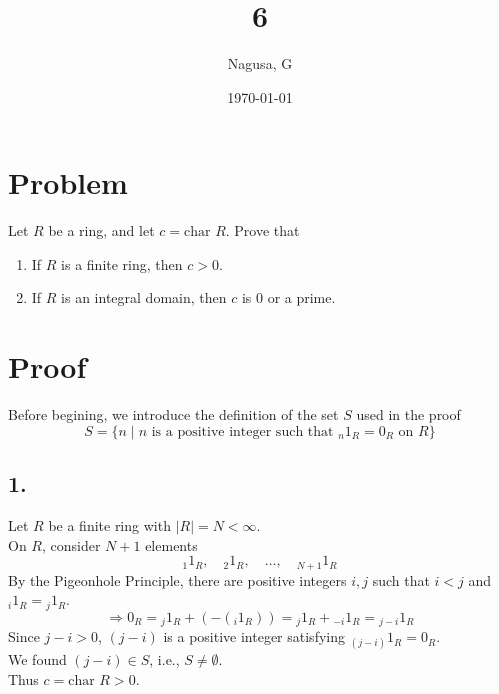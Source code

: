 \documentclass[11pt, a4paper]{article}
\title{6}
\author{Nagusa, G}
\date{\today}
\begin{document}
\maketitle

\section*{Problem}
Let $R$ be a ring, and let $c = \text{char } R$.
Prove that
\begin{enumerate}
    \item If $R$ is a finite ring, then $c > 0$.
    \item If $R$ is an integral domain, then $c$ is $0$ or a prime.
\end{enumerate}

\section*{Proof}
Before begining, we introduce the definition of the set $S$ used in the proof
\[
S = \{n \mid n \text{ is a positive integer such that } {}_n 1_R = 0_R \text{ on } R\}
\]

\subsection*{1.}
Let $R$ be a finite ring with $|R| = N < \infty$.\\
On $R$, consider $N+1$ elements
\[
{}_1 1_R,\quad {}_2 1_R,\quad \dots ,\quad {}_{N+1} 1_R
\]
By the Pigeonhole Principle, there are positive integers $i,j$ such that $i < j$ and ${}_i 1_R = {}_j 1_R$.
\[
\Rightarrow 0_R = {}_j 1_R + (-({}_i 1_R)) = {}_j 1_R + {}_{-i} 1_R = {}_{j-i} 1_R
\]
Since $j-i > 0$, $(j-i)$ is a positive integer satisfying ${}_{(j-i)} 1_R = 0_R$.\\
We found $(j-i) \in S$, i.e., $S \neq \emptyset$.\\
Thus $c = \text{char } R > 0$.
\end{document}
